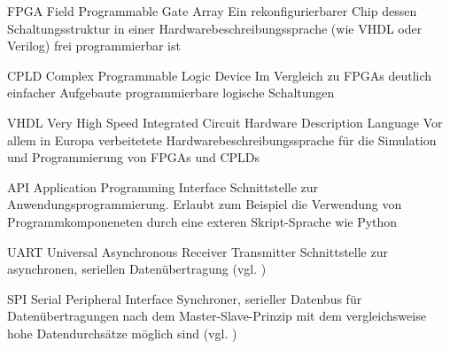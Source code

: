 
	{FPGA}
	{Field Programmable Gate Array}
	{Ein rekonfigurierbarer Chip dessen Schaltungsstruktur in einer Hardwarebeschreibungssprache (wie VHDL oder Verilog) frei programmierbar ist\cite{wiki:FPGA}} 

	{CPLD}
	{Complex Programmable Logic Device}
	{Im Vergleich zu FPGAs deutlich einfacher Aufgebaute programmierbare logische Schaltungen\cite{wiki:CPLD}}

	{VHDL}
	{Very High Speed Integrated Circuit Hardware Description Language}
	{Vor allem in Europa verbeitetete Hardwarebeschreibungssprache für die Simulation und Programmierung von FPGAs und CPLDs\cite{wiki:VHDL}}


	{API}
	{Application Programming Interface}
	{Schnittstelle zur Anwendungsprogrammierung. Erlaubt zum Beispiel die Verwendung von Programmkomponeneten durch eine exteren Skript-Sprache wie Python\cite{wiki:API}}

	{UART}
	{Universal Asynchronous Receiver Transmitter}
	{Schnittstelle zur asynchronen, seriellen Datenübertragung (vgl. \cite{wiki:UART})}


	{SPI}
	{Serial Peripheral Interface}
	{Synchroner, serieller Datenbus für Datenübertragungen nach dem Master-Slave-Prinzip mit dem vergleichsweise hohe Datendurchsätze möglich sind (vgl. \cite{wiki:SPI})}








